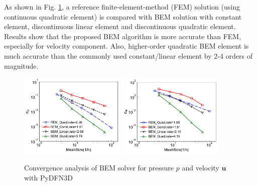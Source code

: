 \documentclass[num-refs]{wiley-networks}
\begin{document}
As shown in Fig. \ref{fig:BEM_Convergence}, a reference finite-element-method (FEM) solution (using continuous quadratic element) is compared with BEM solution with constant element, discontinuous linear element and discontinuous quadratic element. Results show that the proposed BEM algorithm is more accurate than FEM, especially for velocity component. Also, higher-order quadratic BEM element is much accurate than the commonly used constant/linear element by 2-4 orders of magnitude.
\begin{figure}[h!]
\centering
\includegraphics[width=0.45\textwidth]{L2_Pressure.pdf}
\includegraphics[width=0.45\textwidth]{L2_Velocity.pdf}
\caption{Convergence analysis of BEM solver for pressure $p$ and velocity $\mathbf{u}$ with PyDFN3D }
\label{fig:BEM_Convergence}
\end{figure}
\end{document}
